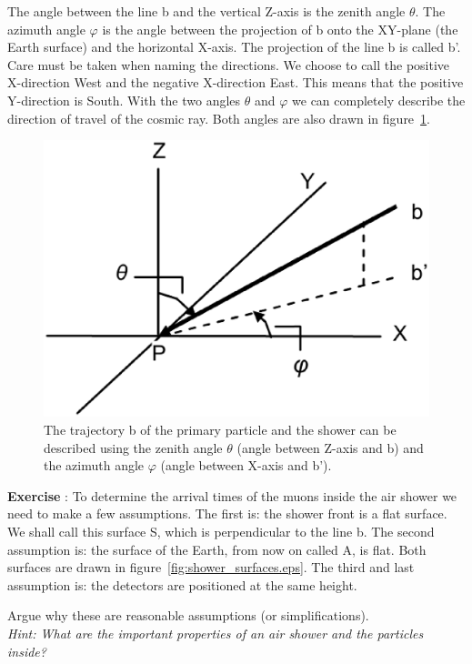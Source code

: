 \documentclass[12pt,a4paper]{article}
\numberwithin{equation}{section}
\numberwithin{figure}{section}
\newcounter{Exercise}
\numberwithin{table}{section}
\begin{document}
The angle between the line b and the vertical Z-axis is the zenith angle $\theta$. The azimuth angle $\varphi$ is the angle between the projection of b onto the XY-plane (the Earth surface) and the horizontal X-axis. The projection of the line b is called b'. Care must be taken when naming the directions. We choose to call the positive X-direction West and the negative X-direction East. This means that the positive Y-direction is South. With the two angles $\theta$ and $\varphi$ we can completely describe the direction of travel of the cosmic ray. Both angles are also drawn in figure~\ref{fig:shower_angles}.

\begin{figure}\begin{center}
\includegraphics[scale=0.45]{shower_angles.eps}
\caption{The trajectory b of the primary particle and the shower can be described using the zenith angle $\theta$ (angle between Z-axis and b) and the azimuth angle $\varphi$ (angle between X-axis and b').}\label{fig:shower_angles}
\end{center}\end{figure}

\begin{shaded}
\textbf{Exercise \theExercise {}} : To determine the arrival times of the muons inside the air shower we need to make a few assumptions. The first is: the shower front is a flat surface. We shall call this surface S, which is perpendicular to the line b. The second assumption is: the surface of the Earth, from now on called A, is flat. Both surfaces are drawn in figure~\ref{fig:shower_surfaces.eps}. The third and last assumption is: the detectors are positioned at the same height.

Argue why these are reasonable assumptions (or simplifications). \\
\emph{Hint: What are the important properties of an air shower and the particles inside?}\end{shaded}
\end{document}

